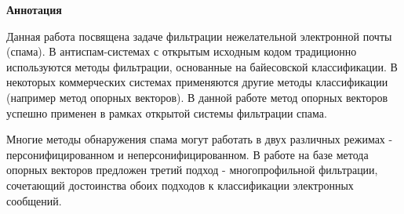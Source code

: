 \newpage
\textbf{Аннотация}

Данная работа посвящена задаче фильтрации нежелательной электронной почты (спама). В антиспам-системах с открытым исходным кодом традиционно используются методы фильтрации, основанные на байесовской классификации. В некоторых коммерческих системах применяются другие методы классификации (например метод опорных векторов). В данной работе метод опорных векторов успешно применен в рамках открытой системы фильтрации спама.

Многие методы обнаружения спама могут работать в двух различных режимах - персонифицированном и неперсонифицированном. В работе на базе метода опорных векторов предложен третий подход - многопрофильной фильтрации, сочетающий достоинства обоих подходов к классификации электронных сообщений.
